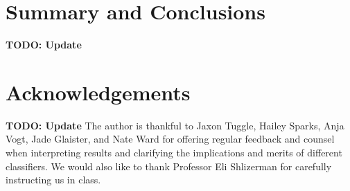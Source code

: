 \documentclass[11pt]{amsart}
\begin{document}



\section{Summary and Conclusions}\label{sec:conclusions} 
\textbf{TODO: Update}

\section*{Acknowledgements}
\textbf{TODO: Update}
The author is thankful to Jaxon Tuggle, Hailey Sparks, Anja Vogt, Jade Glaister, and Nate Ward for offering regular feedback and counsel when interpreting results and clarifying the implications and merits of different classifiers.
We would also like to thank Professor Eli Shlizerman for carefully instructing us in class.


\end{document}
